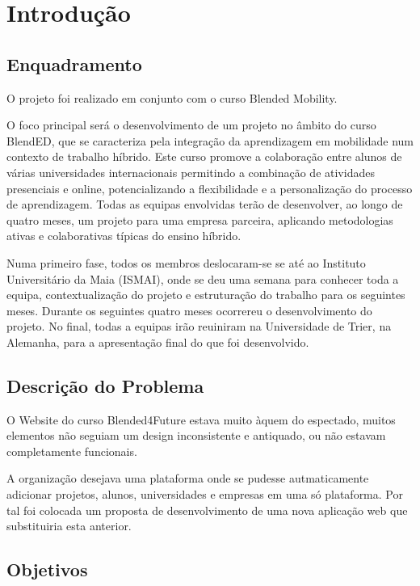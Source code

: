 \chapter{Introdução}
\label{chap:introducao}

\section{Enquadramento}
\label{sec:introducao_enquadramento}

O projeto foi realizado em conjunto com o curso Blended Mobility.

O foco principal será o desenvolvimento de um projeto no âmbito do curso BlendED, que se caracteriza pela integração da aprendizagem em mobilidade num contexto de trabalho híbrido. Este curso promove a colaboração entre alunos de várias universidades internacionais permitindo a combinação de atividades presenciais e online, potencializando a flexibilidade e a personalização do processo de aprendizagem. Todas as equipas envolvidas terão de desenvolver, ao longo de quatro meses, um projeto para uma empresa parceira, aplicando metodologias ativas e colaborativas típicas do ensino híbrido.

Numa primeiro fase, todos os membros deslocaram-se se até ao Instituto Universitário da Maia (ISMAI), onde se deu uma semana para conhecer toda a equipa, contextualização do projeto e estruturação do trabalho para os seguintes meses. Durante os seguintes quatro meses ocorrereu o desenvolvimento do projeto. No final, todas a equipas irão reuiniram na Universidade de Trier, na Alemanha, para a apresentação final do que foi desenvolvido.



\section{Descrição do Problema}
\label{sec:introducao_descproblema}

O Website do curso Blended4Future estava muito àquem do espectado, muitos elementos não seguiam um design inconsistente e antiquado, ou não estavam completamente funcionais. 

A organização desejava uma plataforma onde se pudesse autmaticamente adicionar projetos, alunos, universidades e empresas em uma só plataforma. Por tal foi colocada um proposta de desenvolvimento de uma nova aplicação web que substituiria esta anterior. 



\section{Objetivos}

